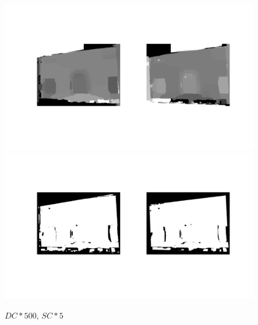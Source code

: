\documentclass[12pt]{article}
\begin{document}
\vspace{5mm}
\begin{figure}[H]
	\centering
	\includegraphics[width=1.1\textwidth]{gc_500_5_1.jpg}
	\includegraphics[width=1.1\textwidth]{gc_500_5_2.jpg}
	\caption{$DC*500$, $SC*5$}
	\label{fig1}
\end{figure}
\end{document}
